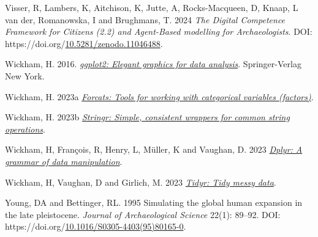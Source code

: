 \documentclass[
]{article}
\newlength{\cslhangindent}
\newlength{\cslentryspacingunit} %
\newenvironment{CSLReferences}[2] %
 {%
  \setlength{\parindent}{0pt}
  \ifodd #1
  \let\oldpar\par
  \def\par{\hangindent=\cslhangindent\oldpar}
  \fi
  \setlength{\parskip}{#2\cslentryspacingunit}
 }%
 {}
\begin{document}
\begin{CSLReferences}{1}{0}
\leavevmode{}%
Visser, R, Lambers, K, Aitchison, K, Jutte, A, Rocks-Macqueen, D, Knaap, L van der, Romanowska, I and Brughmans, T. 2024 \emph{The Digital Competence Framework for Citizens (2.2) and Agent-Based modelling for Archaeologists}. DOI: https://doi.org/\href{https://doi.org/10.5281/zenodo.11046488}{10.5281/zenodo.11046488}.

\leavevmode{}%
Wickham, H. 2016. \emph{\href{http://ggplot2.org}{ggplot2: Elegant graphics for data analysis}}. Springer-Verlag New York.

\leavevmode{}%
Wickham, H. 2023a \emph{\href{https://forcats.tidyverse.org/}{Forcats: Tools for working with categorical variables (factors)}}.

\leavevmode{}%
Wickham, H. 2023b \emph{\href{https://stringr.tidyverse.org}{Stringr: Simple, consistent wrappers for common string operations}}.

\leavevmode{}%
Wickham, H, François, R, Henry, L, Müller, K and Vaughan, D. 2023 \emph{\href{https://dplyr.tidyverse.org}{Dplyr: A grammar of data manipulation}}.

\leavevmode{}%
Wickham, H, Vaughan, D and Girlich, M. 2023 \emph{\href{https://tidyr.tidyverse.org}{Tidyr: Tidy messy data}}.

\leavevmode{}%
Young, DA and Bettinger, RL. 1995 Simulating the global human expansion in the late pleistocene. \emph{Journal of Archaeological Science} 22(1): 89--92. DOI: https://doi.org/\href{https://doi.org/10.1016/S0305-4403(95)80165-0}{10.1016/S0305-4403(95)80165-0}.

\end{CSLReferences}
\end{document}
